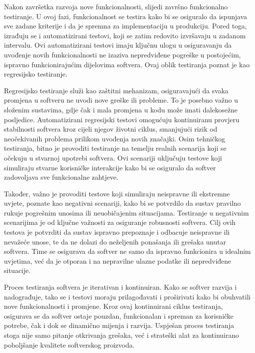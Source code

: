 Nakon završetka razvoja nove funkcionalnosti, slijedi završno funkcionalno testiranje.
U ovoj fazi, funkcionalnost se testira kako bi se osiguralo da ispunjava sve zadane kriterije i da je spremna za implementaciju u produkciju.
Pored toga, izrađuju se i automatizirani testovi, koji se zatim redovito izvršavaju u zadanom intervalu.
Ovi automatizirani testovi imaju ključnu ulogu u osiguravanju da uvođenje novih funkcionalnosti ne izaziva nepredviđene pogreške u postojećim, ispravno funkcionirajućim dijelovima softvera.
Ovaj oblik testiranja poznat je kao regresijsko testiranje.

Regresijsko testiranje služi kao zaštitni mehanizam, osiguravajući da svaka promjena u softveru ne uvodi nove greške ili probleme.
To je posebno važno u složenim sustavima, gdje čak i mala promjena u kodu može imati dalekosežne posljedice.
Automatizirani regresijski testovi omogućuju kontinuiranu provjeru stabilnosti softvera kroz cijeli njegov životni ciklus, smanjujući rizik od neočekivanih problema prilikom uvođenja novih značajki.
Osim tehničkog testiranja, bitno je provoditi testiranje na temelju realnih scenarija koji se očekuju u stvarnoj upotrebi softvera.
Ovi scenariji uključuju testove koji simuliraju stvarne korisničke interakcije kako bi se osiguralo da softver zadovoljava sve funkcionalne zahtjeve.

Također, važno je provoditi testove koji simuliraju neispravne ili ekstremne uvjete, poznate kao negativni scenariji, kako bi se potvrdilo da sustav pravilno rukuje pogrešnim unosima ili neuobičajenim situacijama.
Testiranje u negativnim scenarijima je od ključne važnosti za osiguranje robusnosti softvera.
Cilj ovih testova je potvrditi da sustav ispravno prepoznaje i odbacuje neispravne ili nevažeće unose, te da ne dolazi do neželjenih ponašanja ili grešaka unutar softvera.
Time se osigurava da softver ne samo da ispravno funkcionira u idealnim uvjetima, već da je otporan i na nepravilne ulazne podatke ili nepredviđene situacije.

Proces testiranja softvera je iterativan i kontinuiran.
Kako se softver razvija i nadograđuje, tako se i testovi moraju prilagođavati i proširivati kako bi obuhvatili nove funkcionalnosti i promjene.
Kroz ovaj kontinuirani ciklus testiranja, osigurava se da softver ostaje pouzdan, funkcionalan i spreman za korisničke potrebe, čak i dok se dinamično mijenja i razvija.
Uspješan proces testiranja stoga nije samo pitanje otkrivanja grešaka, već i strateški alat za kontinuirano poboljšanje kvalitete softverskog proizvoda.

